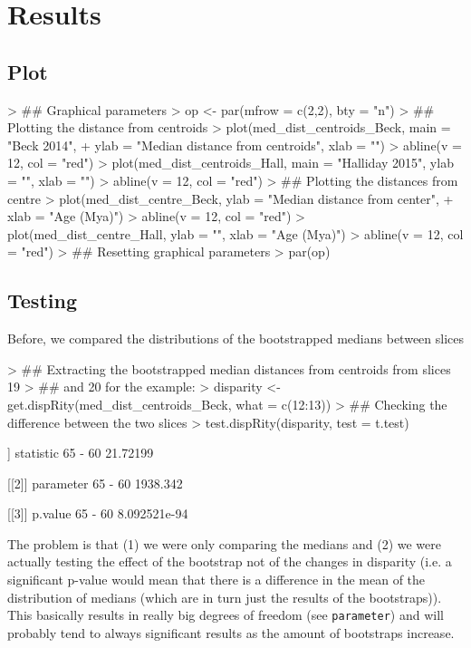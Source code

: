 \documentclass{article}
\begin{document}
\section{Results}

\subsection{Plot}

\begin{Schunk}
\begin{Sinput}
> ## Graphical parameters
> op <- par(mfrow = c(2,2), bty = "n")
> ## Plotting the distance from centroids
> plot(med_dist_centroids_Beck, main = "Beck 2014",
+     ylab = "Median distance from centroids", xlab = "")
> abline(v = 12, col = "red")
> plot(med_dist_centroids_Hall, main = "Halliday 2015", ylab = "", xlab = "")
> abline(v = 12, col = "red")
> ## Plotting the distances from centre
> plot(med_dist_centre_Beck, ylab = "Median distance from center",
+     xlab = "Age (Mya)")
> abline(v = 12, col = "red")
> plot(med_dist_centre_Hall, ylab = "", xlab = "Age (Mya)")
> abline(v = 12, col = "red")
> ## Resetting graphical parameters
> par(op)
\end{Sinput}
\end{Schunk}

\subsection{Testing}

Before, we compared the distributions of the bootstrapped medians between slices

\begin{Schunk}
\begin{Sinput}
> ## Extracting the bootstrapped median distances from centroids from slices 19
> ## and 20 for the example:
> disparity <- get.dispRity(med_dist_centroids_Beck, what = c(12:13))
> ## Checking the difference between the two slices
> test.dispRity(disparity, test = t.test)
\end{Sinput}
\begin{Soutput}
[[1]]
        statistic
65 - 60  21.72199

[[2]]
        parameter
65 - 60  1938.342

[[3]]
             p.value
65 - 60 8.092521e-94
\end{Soutput}
\end{Schunk}

The problem is that (1) we were only comparing the medians and (2) we were actually testing the effect of the bootstrap not of the changes in disparity (i.e. a significant p-value would mean that there is a difference in the mean of the distribution of medians (which are in turn just the results of the bootstraps)).
This basically results in really big degrees of freedom (see \texttt{parameter}) and will probably tend to always significant results as the amount of bootstraps increase.
\end{document}
